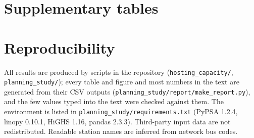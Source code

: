 \documentclass[10pt]{article}
\begin{document}



\appendix
\section{Supplementary tables}









\FloatBarrier
\section{Reproducibility}
All results are produced by scripts in the repository (\texttt{hosting\_capacity/}, \texttt{planning\_study/}); every table and figure
and most numbers in the text are generated from their CSV outputs (\texttt{planning\_study/\allowbreak report/\allowbreak make\_report.py}), and the few values
typed into the text were checked against them. The environment is listed in
\texttt{planning\_study/\allowbreak requirements.txt} (PyPSA 1.2.4, linopy 0.10.1, HiGHS 1.16, pandas 2.3.3). Third-party input data are not
redistributed. Readable station names are inferred from network bus codes.
\end{document}
